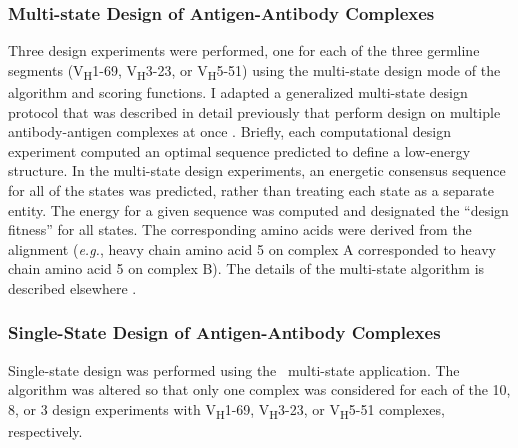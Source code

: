 \subsubsection{Multi-state Design of Antigen-Antibody Complexes}
Three design experiments were performed, one for each of the three germline segments (V\textsubscript{H}1-69, V\textsubscript{H}3-23, or V\textsubscript{H}5-51) using the multi-state design mode of the \rosetta algorithm and scoring functions. I adapted a generalized multi-state design protocol that was described in detail previously that perform design on multiple antibody-antigen complexes at once \citep{LeaverFay:2011ji}. Briefly, each computational design experiment computed an optimal sequence predicted to define a low-energy structure.  In the multi-state design experiments, an energetic consensus sequence for all of the states was predicted, rather than treating each state as a separate entity. The energy for a given sequence was computed and designated the ``design fitness'' for all states. The corresponding amino acids were derived from the alignment (\textit{e.g.}, heavy chain amino acid 5 on complex A corresponded to heavy chain amino acid 5 on complex B). The details of the multi-state algorithm is described elsewhere \citep{LeaverFay:2011ji}.

\subsubsection{Single-State Design of Antigen-Antibody Complexes}
Single-state design was performed using the \rosetta~multi-state application. The algorithm was altered so that only one complex was considered for each of the 10, 8, or 3 design experiments with V\textsubscript{H}1-69, V\textsubscript{H}3-23, or V\textsubscript{H}5-51 complexes, respectively.

